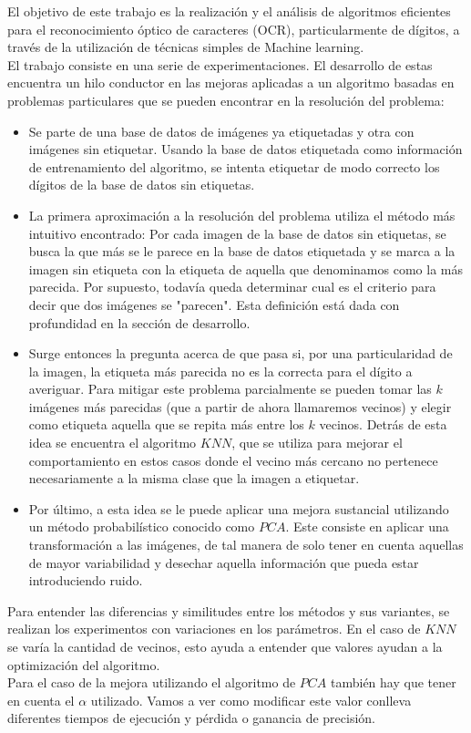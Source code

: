El objetivo de este trabajo es la realización y el análisis de algoritmos eficientes para el reconocimiento óptico de caracteres (OCR), particularmente de dígitos,  a través de la utilización de técnicas simples de Machine learning.
\\
El trabajo consiste en una serie de experimentaciones. El desarrollo de estas encuentra un hilo conductor en las mejoras aplicadas a un algoritmo basadas en problemas particulares que se pueden encontrar en la resolución del problema: 

\begin{itemize}

  \item Se parte de una base de datos de imágenes ya etiquetadas y otra con imágenes sin etiquetar. Usando la base de datos etiquetada como información de entrenamiento del algoritmo, se intenta etiquetar de modo correcto los dígitos de la base de datos sin etiquetas.

  \item La primera aproximación a la resolución del problema utiliza el método más intuitivo encontrado: Por cada imagen de la base de datos sin etiquetas, se busca la que más se le parece en la base de datos etiquetada y se marca a la imagen sin etiqueta con la etiqueta de aquella que denominamos como la más parecida. Por supuesto, todavía queda determinar cual es el criterio para decir que dos imágenes se "parecen". Esta definición está dada con profundidad en la sección de desarrollo.

  \item Surge entonces la pregunta acerca de que pasa si, por una particularidad de la imagen, la etiqueta más parecida no es la correcta para el dígito a averiguar. Para mitigar este problema parcialmente se pueden tomar las $k$ imágenes más parecidas (que a partir de ahora llamaremos vecinos) y elegir como etiqueta aquella que se repita más entre los $k$ vecinos. Detrás de esta idea se encuentra el algoritmo $KNN$, que se utiliza para mejorar el comportamiento en estos casos donde el vecino más cercano no pertenece necesariamente a la misma clase que la imagen a etiquetar.

  \item Por último, a esta idea se le puede aplicar una mejora sustancial utilizando un método probabilístico conocido como $PCA$. Este consiste en aplicar una transformación a las imágenes, de tal manera de solo tener en cuenta aquellas de mayor variabilidad y desechar aquella información que pueda estar introduciendo ruido.

\end{itemize}
Para entender las diferencias y similitudes entre los métodos y sus variantes, se realizan los experimentos con variaciones en los parámetros. En el caso de
$KNN$ se varía la cantidad de vecinos, esto ayuda a entender que valores ayudan a la optimización del algoritmo.
\\
Para el caso de la mejora utilizando el algoritmo de $PCA$ también hay que tener en cuenta el $\alpha$ utilizado. Vamos a ver como modificar este valor
conlleva diferentes tiempos de ejecución y pérdida o ganancia de precisión.
